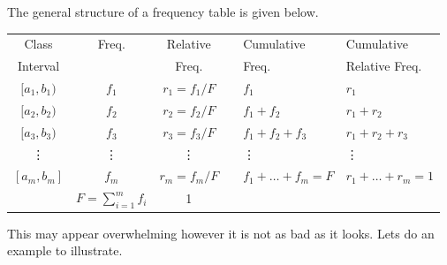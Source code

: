 The general structure of a frequency table is given below.

\begin{center}
\def\arraystretch{1.15}
\begin{tabular}{c c c c l l}
Class			&	Freq.		&	Relative			&	&	Cumulative				&	Cumulative	\\
Interval			&			&	Freq.				&  	&	Freq.						&	Relative Freq.	\\
\hline
$[a_{1}, b_{1})$		&	$f_{1}$	&	$r_{1} = f_{1} / F$	& 	&	$f_{1}$					&	$r_{1}$\\
$[a_{2}, b_{2})$		&	$f_{2}$	&	$r_{2} = f_{2} / F$	&  	&	$f_{1} + f_{2}$				&	$r_{1}+r_{2}$\\
$[a_{3}, b_{3})$		&	$f_{3}$	&	$r_{3} = f_{3} / F$	& 	&	$f_{1} + f_{2} + f_{3}$		&	$r_{1}+r_{2}+r_{3}$\\
\vdots			&	\vdots	&	\vdots			&  	&	\hspace{0.75cm} \vdots		&	\hspace{0.75cm} \vdots\\
$[a_{m}, b_{m}]$	&	$f_{m}$	&	$r_{m} = f_{m} / F$	& 	&	$f_{1} + \ldots + f_{m} = F$	&	$r_{1} + \ldots + r_{m} = 1$\\
\hline
				&	$F = \displaystyle\sum_{i=1}^{m} f_{i}$ & 1 \\
\end{tabular}
\end{center}

\noindent
This may appear overwhelming however it is not as bad as it looks.
Lets do an example to illustrate.

